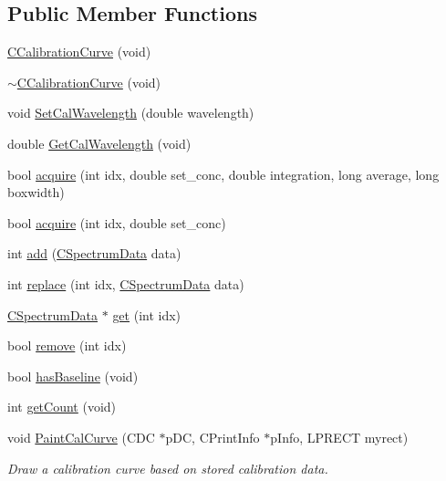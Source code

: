 \subsection*{Public Member Functions}
\begin{DoxyCompactItemize}
\item 
\hyperlink{classCCalibrationCurve_a026901601dbaeb81bc8f39aa847ab241}{CCalibrationCurve} (void)
\item 
\hyperlink{classCCalibrationCurve_a0e77dc015e5faadae5e924911c836a77}{$\sim$CCalibrationCurve} (void)
\item 
void \hyperlink{classCCalibrationCurve_a34355b48eb894115f9c6e8b3f1cfd0c7}{SetCalWavelength} (double wavelength)
\item 
double \hyperlink{classCCalibrationCurve_a03e94704b773f5872162809b9ccc1701}{GetCalWavelength} (void)
\item 
bool \hyperlink{classCCalibrationCurve_ab1e1a60d5806e9a2445ebe50c2c71c3b}{acquire} (int idx, double set\_\-conc, double integration, long average, long boxwidth)
\item 
bool \hyperlink{classCCalibrationCurve_ac41b51a11cbf4d46e5e8cd01465cd1c7}{acquire} (int idx, double set\_\-conc)
\item 
int \hyperlink{classCCalibrationCurve_a7e8dbc6ae5cb11deaafad88a2fb41ff1}{add} (\hyperlink{classCSpectrumData}{CSpectrumData} data)
\item 
int \hyperlink{classCCalibrationCurve_a4bce3316ed741b0b231d03d48b24f493}{replace} (int idx, \hyperlink{classCSpectrumData}{CSpectrumData} data)
\item 
\hyperlink{classCSpectrumData}{CSpectrumData} $\ast$ \hyperlink{classCCalibrationCurve_a0d572610811ce542042e17e7e34af864}{get} (int idx)
\item 
bool \hyperlink{classCCalibrationCurve_a12eeb53660e1199d970f6ba63e3c2e10}{remove} (int idx)
\item 
bool \hyperlink{classCCalibrationCurve_adda16926f5dfd9c30bafc14cc13c839f}{hasBaseline} (void)
\item 
int \hyperlink{classCCalibrationCurve_abbc2743a81d5566b90c09109cf200466}{getCount} (void)
\item 
void \hyperlink{classCCalibrationCurve_a9c3ea937334300851386139ac3cdc378}{PaintCalCurve} (CDC $\ast$pDC, CPrintInfo $\ast$pInfo, LPRECT myrect)
\begin{DoxyCompactList}\small\item\em Draw a calibration curve based on stored calibration data. \item\end{DoxyCompactList}\item 

\end{DoxyCompactItemize}
